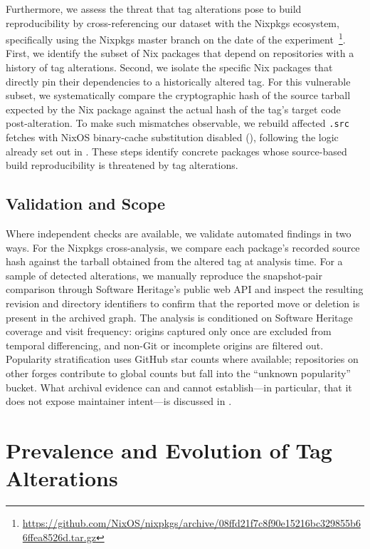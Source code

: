 Furthermore, we assess the threat that tag alterations pose to build reproducibility by cross-referencing our dataset with the Nixpkgs ecosystem, specifically using the Nixpkgs master branch on the date of the experiment~\footnote{\url{https://github.com/NixOS/nixpkgs/archive/08ffd21f7c8f90e15216bc329855b66ffea8526d.tar.gz}}.
First, we identify the subset of Nix packages that depend on repositories with a history of tag alterations.
Second, we isolate the specific Nix packages that directly pin their dependencies to a historically altered tag.
For this vulnerable subset, we systematically compare the cryptographic hash of the source tarball expected by the Nix package against the actual hash of the tag's target code post-alteration.
To make such mismatches observable, we rebuild affected \texttt{.src} fetches with NixOS binary-cache substitution disabled (), following the logic already set out in .
These steps identify concrete packages whose source-based build reproducibility is threatened by tag alterations.

\subsection{Validation and Scope}
\label{subsec:tags-scope-limits}

Where independent checks are available, we validate automated findings in two ways.
For the Nixpkgs cross-analysis, we compare each package's recorded source hash against the tarball obtained from the altered tag at analysis time.
For a sample of detected alterations, we manually reproduce the snapshot-pair comparison through Software Heritage's public web API and inspect the resulting revision and directory identifiers to confirm that the reported move or deletion is present in the archived graph.
The analysis is conditioned on Software Heritage coverage and visit frequency: origins captured only once are excluded from temporal differencing, and non-Git or incomplete origins are filtered out.
Popularity stratification uses GitHub star counts where available; repositories on other forges contribute to global counts but fall into the ``unknown popularity'' bucket.
What archival evidence can and cannot establish---in particular, that it does not expose maintainer intent---is discussed in .

\section{Prevalence and Evolution of Tag Alterations}
\label{sec:tags-prevalence}


